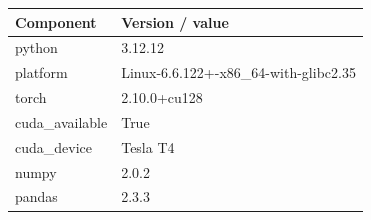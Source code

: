 \begin{tabular}{ll}
\toprule
Component & Version / value \\
\midrule
python & 3.12.12 \\
platform & Linux-6.6.122+-x86_64-with-glibc2.35 \\
torch & 2.10.0+cu128 \\
cuda_available & True \\
cuda_device & Tesla T4 \\
numpy & 2.0.2 \\
pandas & 2.3.3 \\
\bottomrule
\end{tabular}
